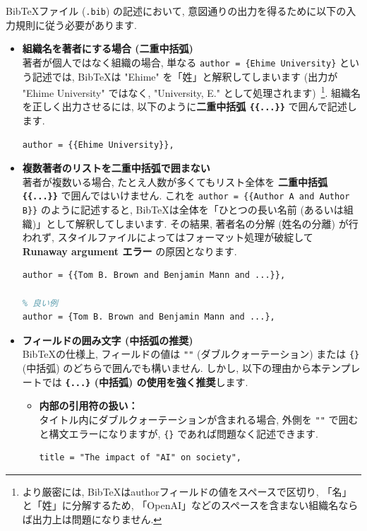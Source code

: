 \documentclass{ltjsarticle}
\begin{document}
BibTeXファイル (\texttt{.bib}) の記述において, 意図通りの出力を得るために以下の入力規則に従う必要があります.

\begin{itemize}
    \item \textbf{組織名を著者にする場合 (二重中括弧)} \\
    著者が個人ではなく組織の場合, 単なる \texttt{author = \{Ehime University\}} という記述では, BibTeXは "Ehime" を「姓」と解釈してしまいます (出力が "Ehime University" ではなく, "University, E." として処理されます)~\footnote{より厳密には, BibTeXはauthorフィールドの値をスペースで区切り, 「名」と「姓」に分解するため, 「OpenAI」などのスペースを含まない組織名ならば出力上は問題になりません.}. 
    組織名を正しく出力させるには, 以下のように\textbf{二重中括弧 \texttt{\{\{...\}\}}} で囲んで記述します.
    
\begin{lstlisting}[language=TeX]
author = {{Ehime University}},
\end{lstlisting}

\item \textbf{複数著者のリストを二重中括弧で囲まない} \\
    著者が複数いる場合, たとえ人数が多くてもリスト全体を \textbf{二重中括弧 \texttt{\{\{...\}\}}} で囲んではいけません. 
    これを \texttt{author = \{\{Author A and Author B\}\}} のように記述すると, BibTeXは全体を「ひとつの長い名前 (あるいは組織)」として解釈してしまいます. 
    その結果, 著者名の分解 (姓名の分離) が行われず, スタイルファイルによってはフォーマット処理が破綻して \textbf{Runaway argument エラー} の原因となります.

\begin{lstlisting}[language=TeX]
% 悪い例 (コンパイルエラーの原因になります)
author = {{Tom B. Brown and Benjamin Mann and ...}},

% 良い例
author = {Tom B. Brown and Benjamin Mann and ...},
\end{lstlisting}    

\item \textbf{フィールドの囲み文字 (中括弧の推奨)} \\
    BibTeXの仕様上, フィールドの値は \texttt{""} (ダブルクォーテーション) または \texttt{\{\}} (中括弧) のどちらで囲んでも構いません. 
    しかし, 以下の理由から本テンプレートでは \textbf{\texttt{\{...\}} (中括弧) の使用を強く推奨}します.

    \begin{itemize}
        \item \textbf{内部の引用符の扱い：} \\
        タイトル内にダブルクォーテーションが含まれる場合, 外側を \texttt{""} で囲むと構文エラーになりますが, \texttt{\{\}} であれば問題なく記述できます.
\begin{lstlisting}[language=TeX]
% エラーになる例
title = "The impact of "AI" on society",


\end{lstlisting}
\end{itemize}
\end{itemize}
\end{document}
